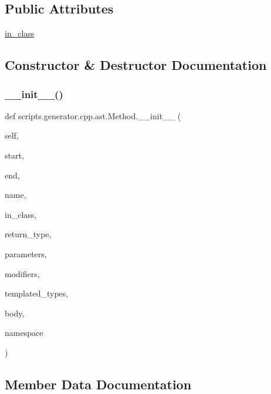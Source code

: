 \subsection*{Public Attributes}
\begin{DoxyCompactItemize}
\item 
\mbox{\hyperlink{classscripts_1_1generator_1_1cpp_1_1ast_1_1_method_aa88ab693dcff49c69f7b84c4a77f7888}{in\+\_\+class}}
\end{DoxyCompactItemize}


\subsection{Constructor \& Destructor Documentation}
\mbox{\label{classscripts_1_1generator_1_1cpp_1_1ast_1_1_method_a21d016bf29107c66ac7f37640a468888}} 
\subsubsection{\texorpdfstring{\_\_init\_\_()}{\_\_init\_\_()}}
{\footnotesize\ttfamily def scripts.\+generator.\+cpp.\+ast.\+Method.\+\_\+\+\_\+init\+\_\+\+\_\+ (\begin{DoxyParamCaption}\item[{}]{self,  }\item[{}]{start,  }\item[{}]{end,  }\item[{}]{name,  }\item[{}]{in\+\_\+class,  }\item[{}]{return\+\_\+type,  }\item[{}]{parameters,  }\item[{}]{modifiers,  }\item[{}]{templated\+\_\+types,  }\item[{}]{body,  }\item[{}]{namespace }\end{DoxyParamCaption})}



\subsection{Member Data Documentation}
\mbox{\label{classscripts_1_1generator_1_1cpp_1_1ast_1_1_method_aa88ab693dcff49c69f7b84c4a77f7888}} 
